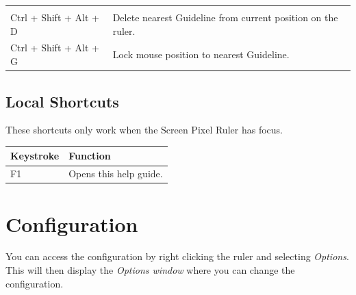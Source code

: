 \documentclass[
]{book}
\begin{document}
\begin{longtable}[]{@{}ll@{}}
\begin{minipage}[t]{0.68\columnwidth}
\end{minipage}\tabularnewline
\begin{minipage}[t]{0.27\columnwidth}\raggedright
Ctrl + Shift + Alt + D\strut
\end{minipage} & \begin{minipage}[t]{0.68\columnwidth}\raggedright
Delete nearest Guideline from current position on the ruler.\strut
\end{minipage}\tabularnewline
\begin{minipage}[t]{0.27\columnwidth}\raggedright
Ctrl + Shift + Alt + G\strut
\end{minipage} & \begin{minipage}[t]{0.68\columnwidth}\raggedright
Lock mouse position to nearest Guideline.\strut
\end{minipage}\tabularnewline
\bottomrule
\end{longtable}

\hypertarget{local-shortcuts}{%
\section{Local Shortcuts}\label{local-shortcuts}}

These shortcuts only work when the Screen Pixel Ruler has focus.

\begin{longtable}[]{@{}ll@{}}
\toprule
Keystroke & Function\tabularnewline
\midrule
\endhead
F1 & Opens this help guide.\tabularnewline
\bottomrule
\end{longtable}

\hypertarget{config}{%
\chapter{Configuration}\label{config}}

You can access the configuration by right clicking the ruler and selecting \emph{Options}.
This will then display the \emph{Options window} where you can change the configuration.
\end{document}
